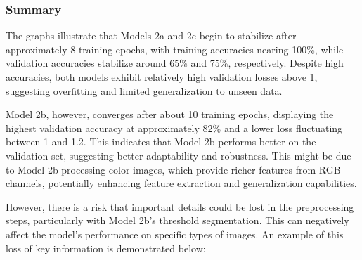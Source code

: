 \subsubsection{Summary}
The graphs illustrate that Models 2a and 2c begin to stabilize after approximately 8 training epochs, with training accuracies nearing 100\%, while validation accuracies stabilize around 65\% and 75\%, respectively. Despite high accuracies, both models exhibit relatively high validation losses above 1, suggesting overfitting and limited generalization to unseen data.

Model 2b, however, converges after about 10 training epochs, displaying the highest validation accuracy at approximately 82\% and a lower loss fluctuating between 1 and 1.2. This indicates that Model 2b performs better on the validation set, suggesting better adaptability and robustness. This might be due to Model 2b processing color images, which provide richer features from RGB channels, potentially enhancing feature extraction and generalization capabilities.

However, there is a risk that important details could be lost in the preprocessing steps, particularly with Model 2b's threshold segmentation. This can negatively affect the model's performance on specific types of images. An example of this loss of key information is demonstrated below:

